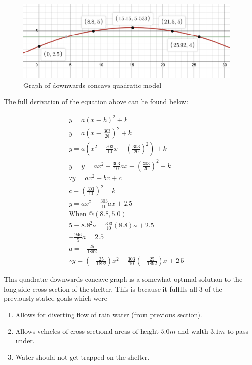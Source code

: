 \documentclass[a4paper,titlepage]{article}
\begin{document}
\begin{figure}[htbp]
    \centering
    \includegraphics[width=\textwidth]{downwardsConcaveGraph.png}
    \caption{Graph of downwards concave quadratic model}
    \label{fig:downwardsConcaveGraph}
\end{figure}

The full derivation of the equation above can be found below:

\begin{gather}
    y=a(x-h)^2+k\\
    y=a(x-\frac{303}{20})^2+k\\
    y=a(x^2-\frac{303}{10}x+(\frac{303}{20})^2)+k\\
    y=y=ax^2-\frac{303}{10}ax+(\frac{303}{20})^2+k\\
    \because y=ax^2+bx+c\\
    c=(\frac{303}{10})^2+k\\
    y=ax^2-\frac{303}{10}ax+2.5\\
    \text{When }@(8.8, 5.0)\\
    5=8.8^2a-\frac{303}{10}(8.8)a+2.5\\
    -\frac{946}{5}a=2.5\\
    a=-\frac{25}{1892}\\
    \therefore y=\left(-\frac{25}{1892}\right)x^{2}-\frac{303}{10}\left(-\frac{25}{1892}\right)x+2.5
\end{gather}

This quadratic downwards concave graph is a somewhat optimal solution to the long-side cross section of the shelter. This is because it fulfills all 3 of the previously stated goals which were:

\begin{enumerate}
    \item Allows for diverting flow of rain water (from previous section).
    \item Allows vehicles of cross-sectional areas of height $5.0\si{m}$ and width $3.1\si{m}$ to pass under.
    \item Water should not get trapped on the shelter.
\end{enumerate}
\end{document}
